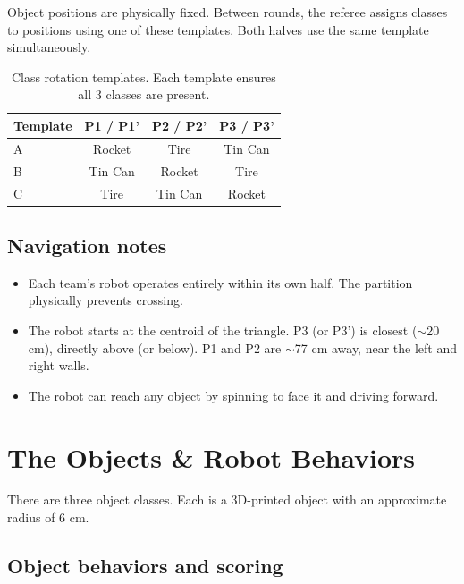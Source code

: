\documentclass[a4]{article}
\begin{document}
Object positions are physically fixed. Between rounds, the referee assigns classes to positions using one of these templates. Both halves use the same template simultaneously.

\begin{table}[H]
\centering
\begin{tabular}{lccc}
\toprule
\textbf{Template} & \textbf{P1 / P1'} & \textbf{P2 / P2'} & \textbf{P3 / P3'} \\
\midrule
A & Rocket & Tire & Tin Can \\
B & Tin Can & Rocket & Tire \\
C & Tire & Tin Can & Rocket \\
\bottomrule
\end{tabular}
\caption{Class rotation templates. Each template ensures all 3 classes are present.}
\end{table}

\subsection*{Navigation notes}

\begin{itemize}
    \item Each team's robot operates entirely within its own half. The partition physically prevents crossing.
    \item The robot starts at the centroid of the triangle. P3 (or P3') is closest ($\sim$20 cm), directly above (or below). P1 and P2 are $\sim$77 cm away, near the left and right walls.
    \item The robot can reach any object by spinning to face it and driving forward.
\end{itemize}

\pagebreak
\section{The Objects \& Robot Behaviors}

There are three object classes. Each is a 3D-printed object with an approximate radius of 6 cm.

\subsection*{Object behaviors and scoring}
\end{document}
